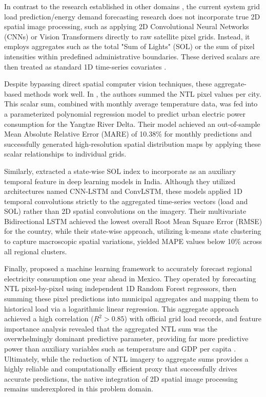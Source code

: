 In contrast to the research established in other domains \cite{schubnel_solarcrossformer_2025,wang_causal-aware_2025}, the current system grid load prediction/energy demand forecasting research does not incorporate true 2D spatial image processing, such as applying 2D Convolutional Neural Networks (CNNs) or Vision Transformers directly to raw satellite pixel grids. Instead, it employs aggregates such as the total "Sum of Lights" (SOL) or the sum of pixel intensities within predefined administrative boundaries. These derived scalars are then treated as standard 1D time-series covariates \cite{borunda_machine_2025,r_forecasting_2025,chen_monthly_2025}.

Despite bypassing direct spatial computer vision techniques, these aggregate-based methods work well. In \cite{chen_monthly_2025}, the authors summed the NTL pixel values per city. This scalar sum, combined with monthly average temperature data, was fed into a parameterized polynomial regression model to predict urban electric power consumption for the Yangtze River Delta. Their model achieved an out-of-sample Mean Absolute Relative Error (MARE) of 10.38\% for monthly predictions and successfully generated high-resolution spatial distribution maps by applying these scalar relationships to individual grids. 

Similarly, \cite{r_forecasting_2025} extracted a state-wise SOL index to incorporate as an auxiliary temporal feature in deep learning models in India. Although they utilized architectures named CNN-LSTM and ConvLSTM, these models applied 1D temporal convolutions strictly to the aggregated time-series vectors (load and SOL) rather than 2D spatial convolutions on the imagery. Their multivariate Bidirectional LSTM achieved the lowest overall Root Mean Square Error (RMSE) for the country, while their state-wise approach, utilizing k-means state clustering to capture macroscopic spatial variations, yielded MAPE values below 10\% across all regional clusters. 

Finally, \cite{borunda_machine_2025} proposed a machine learning framework to accurately forecast regional electricity consumption one year ahead in Mexico. They operated by forecasting NTL pixel-by-pixel using independent 1D Random Forest regressors, then summing these pixel predictions into municipal aggregates and mapping them to historical load via a logarithmic linear regression. This aggregate approach achieved a high correlation ($R^2 > 0.85$) with official grid load records, and feature importance analysis revealed that the aggregated NTL sum was the overwhelmingly dominant predictive parameter, providing far more predictive power than auxiliary variables such as temperature and GDP per capita \cite{borunda_machine_2025}. Ultimately, while the reduction of NTL imagery to aggregate sums provides a highly reliable and computationally efficient proxy that successfully drives accurate predictions, the native integration of 2D spatial image processing remains underexplored in this problem domain.

